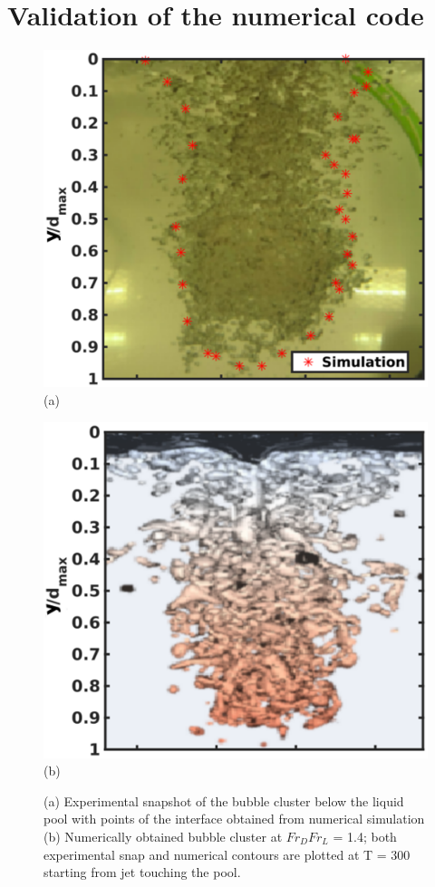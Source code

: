 \section{Validation of the numerical code}
\begin{figure}
	\begin{minipage}{0.5\linewidth}
		\centering
		\includegraphics[width=\linewidth]{chapters/jetPool/Figure6a}
		(a)
	\end{minipage}
	\begin{minipage}{0.5\linewidth}
		\centering
		\includegraphics[width=\linewidth]{chapters/jetPool/Figure6b}
		(b)
	\end{minipage}
	\caption{(a) Experimental snapshot of the bubble cluster below the liquid pool with points of the interface obtained from numerical simulation (b) Numerically obtained bubble cluster at $Fr_DFr_L$ = 1.4; both experimental snap and numerical contours are plotted at T = 300 starting from jet touching the pool.}
	\label{Figure::valid}
\end{figure}
